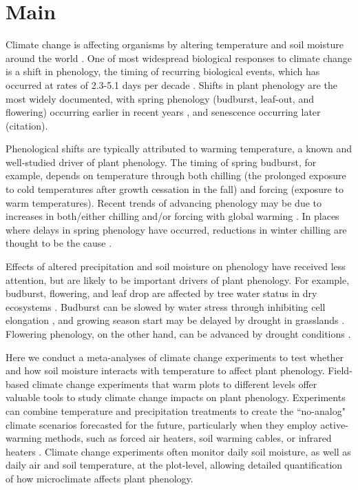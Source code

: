 \documentclass{article}
\begin{document}
\section* {Main}
\par Climate change is affecting organisms by altering temperature and soil moisture around the world \citep{parmesan2006,chen2010}. One of most widespread biological responses to climate change is a shift in phenology, the timing of recurring biological events, which has occurred at rates of 2.3-5.1 days per decade \citep{parmesan2006,poloczanska2013,root2003}. Shifts in plant phenology are the most widely documented, with spring phenology (budburst, leaf-out, and flowering) occurring earlier in recent years \citep{wolkovich2012}, and senescence occurring later (citation). 
\par Phenological shifts are typically attributed to warming temperature, a known and well-studied driver of plant phenology. The timing of spring budburst, for example, depends on temperature through both chilling (the prolonged exposure to cold temperatures after growth cessation in the fall) and forcing (exposure to warm temperatures). Recent trends of advancing phenology may be due to increases in both/either chilling and/or forcing with global warming \cite{fujisawa2010, ibanez2010,cook2012b}. In places where delays in spring phenology have occurred, reductions in winter chilling are thought to be the cause \cite{yu2010}. 
\par Effects of altered precipitation and soil moisture on phenology have received less attention, but are likely to be important drivers of plant phenology. For example, budburst, flowering, and leaf drop are affected by tree water status in dry ecosystems \citep{essiamah1986,reich1984, van1993}. Budburst can be slowed by water stress through inhibiting cell elongation \citep{essiamah1986}, and growing season start may be delayed by drought in grasslands \cite{cui2017}. Flowering phenology, on the other hand, can be advanced by drought conditions \citep{hamann2018}. 
\par Here we conduct a meta-analyses of climate change experiments to test whether and how soil moisture interacts with temperature to affect plant phenology. Field-based climate change experiments that warm plots to different levels offer valuable tools to study climate change impacts on plant phenology. Experiments can combine temperature and precipitation treatments to create the ``no-analog" climate scenarios forecasted for the future, particularly when they employ active-warming methods, such as forced air heaters, soil warming cables, or infrared heaters \citep{shaver2000,williams2007b,aronson2009}. Climate change experiments often monitor daily soil moisture, as well as daily air and soil temperature, at the plot-level, allowing detailed quantification of how microclimate affects plant phenology. 
\end{document}
